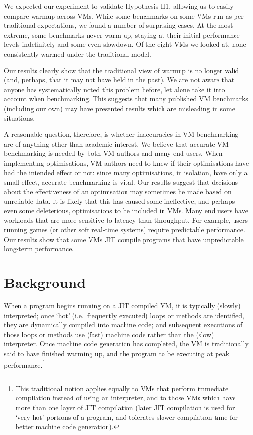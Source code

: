 \documentclass[a4paper,UKenglish]{lipics}
\begin{document}
We expected our experiment to validate Hypothesis H1, allowing us to
easily compare warmup across VMs. While some benchmarks on some VMs run as per
traditional expectations, we found a number of surprising cases. At
the most extreme, some benchmarks never warm up, staying at their initial performance
levels indefinitely and some even slowdown. Of the eight
VMs we looked at, none consistently warmed under the traditional model.

Our results clearly show that the traditional view of warmup is no longer valid (and, perhaps,
that it may not have held in the past). We are not aware that anyone has systematically noted this
problem before, let alone take it into account when benchmarking. This suggests
that many published VM benchmarks (including our own) may have presented
results which are misleading in some situations.

A reasonable question, therefore, is whether inaccuracies in VM benchmarking are of anything
other than academic interest. We believe that accurate VM benchmarking is needed
by both VM authors and many end users. When
implementing optimisations, VM authors need to know if their optimisations have
had the intended effect or not: since many optimisations, in isolation, have only a
small effect, accurate benchmarking is vital. Our results suggest that decisions
about the effectiveness of an optimisation may sometimes be made based on
unreliable data.
It is likely that this has caused some ineffective, and perhaps even some deleterious,
optimisations to be included in VMs. Many end users have workloads that are more
sensitive to latency than throughput. For example, users running games (or other
soft real-time systems) require predictable performance. Our results show that some
VMs JIT compile programs that have unpredictable long-term performance.

%


\section{Background}
\label{sec:warmup}

When a program begins running on a JIT compiled VM, it is typically (slowly)
interpreted; once `hot' (i.e.~frequently executed) loops or methods are
identified, they are dynamically compiled into machine code; and subsequent
executions of those loops or methods use (fast) machine code rather than the
(slow) interpreter. Once machine code generation has completed, the VM is
traditionally said to have finished warming up, and the program to be executing
at peak performance.\footnote{This traditional notion applies equally to VMs
that perform immediate compilation instead of using an interpreter, and to
those VMs which have more than one layer of JIT compilation (later JIT
compilation is used for `very hot' portions of a program, and tolerates slower
compilation time for better machine code generation).}
\end{document}
